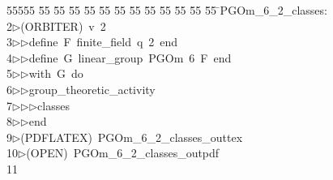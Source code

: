 %
%
\begin{tabbing}
55555 \= 55 \= 55 \= 55 \= 55 \= 55 \= 55 \= 55 \= 55 \= 55 \= 55 \= 55 \= 55 \= \>PGOm\_6\_2\_classes:\\[0pt]
2\>$\triangleright$\>(ORBITER)\ v\ 2\ \\[0pt]
3\>$\triangleright$\>$\triangleright$\>define\ F\ finite\_field\ q\ 2\ end\ \\[0pt]
4\>$\triangleright$\>$\triangleright$\>define\ G\ linear\_group\ PGOm\ 6\ F\ end\ \\[0pt]
5\>$\triangleright$\>$\triangleright$\>with\ G\ do\ \\[0pt]
6\>$\triangleright$\>$\triangleright$\>group\_theoretic\_activity\ \\[0pt]
7\>$\triangleright$\>$\triangleright$\>$\triangleright$\>classes\ \\[0pt]
8\>$\triangleright$\>$\triangleright$\>end\\[0pt]
9\>$\triangleright$\>(PDFLATEX)\ PGOm\_6\_2\_classes\_outtex\\[0pt]
10\>$\triangleright$\>(OPEN)\ PGOm\_6\_2\_classes\_outpdf\\[0pt]
11\>\end{tabbing}
